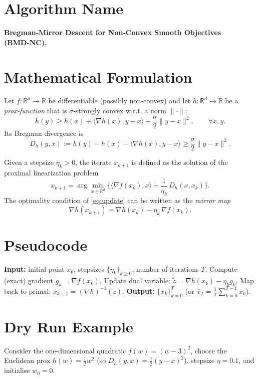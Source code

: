 \documentclass{article}
\begin{document}
\section*{Algorithm Name}
\textbf{Bregman‑Mirror Descent for Non‑Convex Smooth Objectives (BMD‑NC).}

\section*{Mathematical Formulation}
Let $f:\mathbb{R}^d\rightarrow\mathbb{R}$ be differentiable (possibly non‑convex) and let $h:\mathbb{R}^d\rightarrow\mathbb{R}$ be a \emph{prox‑function} that is $\sigma$‑strongly convex w.r.t. a norm $\|\cdot\|$:
\[
h(y)\ge h(x)+\langle\nabla h(x),y-x\rangle+\frac{\sigma}{2}\|y-x\|^{2},
\qquad\forall x,y.
\]
Its Bregman divergence is
\[
D_h(y,x):=h(y)-h(x)-\langle\nabla h(x),y-x\rangle\ge\frac{\sigma}{2}\|y-x\|^{2}.
\]

Given a stepsize $\eta_k>0$, the iterate $x_{k+1}$ is defined as the solution of the proximal linearization problem
\begin{equation}
\boxed{
x_{k+1}
=\arg\min_{x\in\mathbb{R}^{d}}
\Big\{\langle\nabla f(x_k),x\rangle+\frac{1}{\eta_k}\,D_h(x,x_k)\Big\}.
}
\label{eq:update}
\end{equation}
The optimality condition of \eqref{eq:update} can be written as the \emph{mirror map}
\begin{equation}
\nabla h(x_{k+1})=\nabla h(x_k)-\eta_k\,\nabla f(x_k).
\label{eq:mirror}
\end{equation}

\section*{Pseudocode}
\begin{algorithm}[H]
\caption{BMD‑NC}
\begin{algorithmic}[1]
\STATE \textbf{Input:} initial point $x_0$, stepsizes $\{\eta_k\}_{k\ge0}$, number of iterations $T$.
    \STATE Compute (exact) gradient $g_k=\nabla f(x_k)$.
    \STATE Update dual variable: $\tilde{z}= \nabla h(x_k)-\eta_k g_k$.
    \STATE Map back to primal: $x_{k+1}= (\nabla h)^{-1}(\tilde{z})$.
\ENDFOR
\STATE \textbf{Output:} $\{x_k\}_{k=0}^{T}$ (or $\bar x_T=\frac1T\sum_{k=0}^{T-1}x_k$).
\end{algorithmic}
\end{algorithm}

\section*{Dry Run Example}
Consider the one‑dimensional quadratic $f(w)=(w-3)^2$, choose the Euclidean prox $h(w)=\frac12 w^{2}$ (so $D_h(y,x)=\frac12 (y-x)^2$), stepsize $\eta=0.1$, and initialise $w_0=0$.
\end{document}
